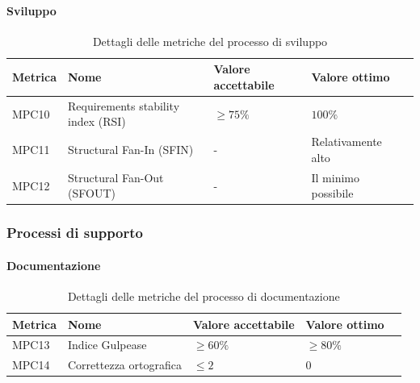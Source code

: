 \documentclass[a4paper,12pt]{article}
\begin{document}
{{{            \paragraph{Sviluppo}
            \leavevmode
                \begin{table}[H]
                \centering
                    \begin{tabular}{|l|l|l|l|l|}
                        \hline
                        \rowcolor{gold}
                        \textbf{Metrica} & \textbf{Nome} & \textbf{Valore accettabile} & \textbf{Valore ottimo} \\
                        \hline
                        MPC10 & Requirements stability index (RSI) & $\ge 75\%$ & $100\%$ \\
                        \hline
                        MPC11 & Structural Fan-In (SFIN) & - & Relativamente alto \\
                        \hline
                        MPC12 & Structural Fan-Out (SFOUT) & - & Il minimo possibile \\
                        \hline
                    \end{tabular}
                    \caption{Dettagli delle metriche del processo di sviluppo} 
                    \label{tab:metriche-sviluppo}
                \end{table}
            
        }

        \subsubsection{Processi di supporto}{

            \paragraph{Documentazione}
            \leavevmode
                \begin{table}[H]
                \centering
                    \begin{tabular}{|l|l|l|l|l|}
                        \hline
                        \rowcolor{gold}
                        \textbf{Metrica} & \textbf{Nome} & \textbf{Valore accettabile} & \textbf{Valore ottimo} \\
                        \hline
                        MPC13 & Indice Gulpease & $\ge 60\%$ & $\ge 80\%$ \\
                        \hline
                        MPC14 & Correttezza ortografica & $\le 2$ & 0 \\
                        \hline
                    \end{tabular}
                    \caption{Dettagli delle metriche del processo di documentazione} 
                    \label{tab:metriche-documentazione}
                \end{table}

}}}
\end{document}
